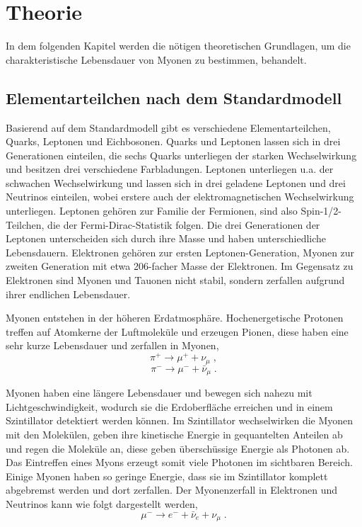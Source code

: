 \section{Theorie}

In dem folgenden Kapitel werden die nötigen theoretischen Grundlagen, um die charakteristische Lebensdauer von Myonen zu bestimmen, behandelt.

\subsection{Elementarteilchen nach dem Standardmodell}

Basierend auf dem Standardmodell gibt es verschiedene Elementarteilchen, Quarks, Leptonen und Eichbosonen. Quarks und Leptonen lassen sich in drei Generationen einteilen, die sechs Quarks unterliegen der starken Wechselwirkung und besitzen drei verschiedene Farbladungen. Leptonen unterliegen u.a. der schwachen Wechselwirkung und lassen sich in drei geladene Leptonen und drei Neutrinos einteilen, wobei erstere auch der elektromagnetischen Wechselwirkung unterliegen. Leptonen gehören zur Familie der Fermionen, sind also Spin-1/2-Teilchen, die der Fermi-Dirac-Statistik folgen. Die drei Generationen der Leptonen unterscheiden sich durch ihre Masse und haben unterschiedliche Lebensdauern. Elektronen gehören zur ersten Leptonen-Generation, Myonen zur zweiten Generation mit etwa 206-facher Masse der Elektronen. Im Gegensatz zu Elektronen sind Myonen und Tauonen nicht stabil, sondern zerfallen aufgrund ihrer endlichen Lebensdauer.

Myonen entstehen in der höheren Erdatmosphäre. Hochenergetische Protonen treffen auf Atomkerne der Luftmoleküle und erzeugen Pionen, diese haben eine sehr kurze Lebensdauer und zerfallen in Myonen, $$\pi^+ \rightarrow \mu^+ + \nu_\mu\; ,$$ $$\pi^- \rightarrow \mu^- + \bar{\nu}_\mu\; .$$

Myonen haben eine längere Lebensdauer und bewegen sich nahezu mit Lichtgeschwindigkeit, wodurch sie die Erdoberfläche erreichen und in einem Szintillator detektiert werden können. Im Szintillator wechselwirken die Myonen mit den Molekülen, geben ihre kinetische Energie in gequantelten Anteilen ab und regen die Moleküle an, diese geben überschüssige Energie als Photonen ab. Das Eintreffen eines Myons erzeugt somit viele Photonen im sichtbaren Bereich. Einige Myonen haben so geringe Energie, dass sie im Szintillator komplett abgebremst werden und dort zerfallen. Der Myonenzerfall in Elektronen und Neutrinos kann wie folgt dargestellt werden, $$\mu^- \rightarrow e^- + \bar{\nu}_e + \nu_\mu\; . $$

